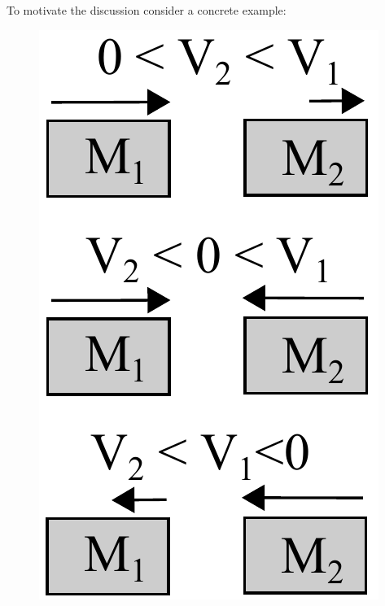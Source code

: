\documentclass{article}
\begin{document}
To motivate the discussion consider a concrete example:  
\begin{figure}
\begin{center}
\begin{minipage}{\linewidth/6}
                \includegraphics[width=1\linewidth]{Figs/little-momentum0.pdf}

\end{minipage}
\end{center}
\end{figure}
\end{document}
